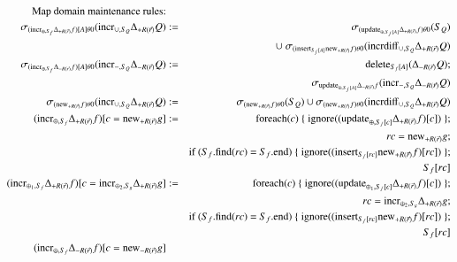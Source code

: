 \documentclass{article}
\begin{document}
%
\begin{figure*}
\begin{eqnarray}
\mbox{Map domain maintenance rules:} && \nonumber\\
\label{eq:md1}
\sigma_{(\algincr_{\oplus, S_f} \Delta_{+R(\vec{r})} f)[A] \theta 0} (\algincr_{\cup, S_Q}
\Delta_{+R(\vec{r})} Q)
&:=&
\sigma_{(\algupdate_{\oplus, S_{f}[A]} \Delta_{+R(\vec{r})} f) \theta 0} (S_Q)
\\
\nonumber && 
\cup\; 
\sigma_{(\alginsert_{S_{f}[A]} \algnew_{+R(\vec{r})} f) \theta 0}
(\algincrdiff_{\cup, S_Q} \Delta_{+R(\vec{r})} Q)
\\
\label{eq:md2}
\sigma_{(\algincr_{\oplus, S_f} \Delta_{-R(\vec{r})} f)[A] \theta 0}
(\algincr_{-,S_Q} \Delta_{-R(\vec{r})}Q) &:=&
\algdelete_{S_f[A]}(\Delta_{-R(\vec{r})} Q);
\\
\nonumber &&
\sigma_{\algupdate_{\oplus, S_f[A]} \Delta_{-R(\vec{r})}f}
(\algincr_{-,S_Q} \Delta_{-R(\vec{r})} Q)
\\
\label{eq:md3}
\sigma_{(\algnew_{+R(\vec{r})} f) \theta 0} (\algincr_{\cup, S_Q}
\Delta_{+R(\vec{r})} Q)
&:=&
\sigma_{(\algnew_{+R(\vec{r})} f) \theta 0} (S_Q)
\cup
\sigma_{(\algnew_{+R(\vec{r})} f) \theta 0}
(\algincrdiff_{\cup, S_Q} \Delta_{+R(\vec{r})} Q)
\\
\label{eq:md4}
(\algincr_{\oplus, S_f} \Delta_{+R(\vec{r})} f)[c=\algnew_{+R(\vec{r})} g]
&:=&
\algfor(\mbox{$c$}) \; \{ \; \mathrm{ignore}((\algupdate_{\oplus, S_{f}[c]} \Delta_{+R(\vec{r})} f)[c]) \; \};
\\
\nonumber && rc = \algnew_{+R(\vec{r})} g;
\\
\nonumber
&& \mbox{if ($S_f$.find($rc$) = $S_f$.end)}
\; \{ \; \mathrm{ignore}((\alginsert_{S_{f}[rc]} \algnew_{+R(\vec{r})} f)[rc]) \; \};
\\
\nonumber && S_{f}[rc]
\\
\label{eq:md5}
(\algincr_{\oplus_1, S_f} \Delta_{+R(\vec{r})} f)
[c=\algincr_{\oplus_2, S_g} \Delta_{+R(\vec{r})} g]
&:=&
\algfor(c) \; \{ \; \mathrm{ignore}((\algupdate_{\oplus_1, S_{f}[c]} \Delta_{+R(\vec{r})} f)[c]) \; \} ;
\\
\nonumber && rc = \algincr_{\oplus_2, S_g} \Delta_{+R(\vec{r})} g;
\\
\nonumber
&& \mbox{if ($S_f$.find($rc$) = $S_f$.end)}
\; \{ \; \mathrm{ignore}((\alginsert_{S_{f}[rc]} \algnew_{+R(\vec{r})} f)[rc]) \; \};
\\
\nonumber && S_{f}[rc]
\\
\label{eq:md6}
(\algincr_{\oplus, S_f}\Delta_{-R(\vec{r})} f)[c = \algnew_{-R(\vec{r})} g]

\end{eqnarray}
\end{figure*}
\end{document}
